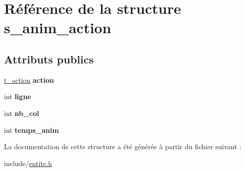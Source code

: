\hypertarget{structs__anim__action}{}\section{Référence de la structure s\+\_\+anim\+\_\+action}
\label{structs__anim__action}
\subsection*{Attributs publics}
\begin{DoxyCompactItemize}
\item 
\mbox{\label{structs__anim__action_afec2d04fad0f9803e6715736067cd119}} 
\hyperlink{entite_8h_abf8170fe3a93ebd8f3701bbf092ece99}{t\+\_\+action} {\bfseries action}
\item 
\mbox{\label{structs__anim__action_a3175be238cac27f8bbf7429d24a502ea}} 
int {\bfseries ligne}
\item 
\mbox{\label{structs__anim__action_a9b2ad67a712c15bbcddaded6e830414e}} 
int {\bfseries nb\+\_\+col}
\item 
\mbox{\label{structs__anim__action_ab785bc45f04f183be33db4a73d7b02f1}} 
int {\bfseries temps\+\_\+anim}
\end{DoxyCompactItemize}


La documentation de cette structure a été générée à partir du fichier suivant \+:\begin{DoxyCompactItemize}
\item 
include/\hyperlink{entite_8h}{entite.\+h}\end{DoxyCompactItemize}
